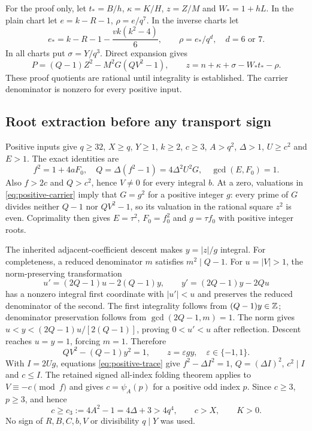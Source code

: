 For the proof only, let $t_*=B/h$, $\kappa=K/H$, $z=Z/M$ and
$W_*=1+hL$. In the plain chart let $e=k-R-1$, $\rho=e/q^7$.
In the inverse charts let
\[
 e_*=k-R-1-\frac{vk(k^2-4)}6,
 \qquad \rho=e_*/q^d,
 \quad d=6\text{ or }7.
\]
In all charts put $\sigma=Y/q^3$. Direct expansion gives
\begin{equation}\label{eq:positive-carrier}
 P=(Q-1)Z^2-M^2G(QV^2-1),\qquad
 z=n+\kappa+\sigma-W_*t_*-\rho.
\end{equation}
These proof quotients are rational until integrality is established.
The carrier denominator is nonzero for every positive input.

\subsection{Root extraction before any transport sign}
Positive inputs give $q\ge32$, $X\ge q$, $Y\ge1$, $k\ge2$,
$c\ge3$, $A>q^2$, $\Delta>1$, $U\ge c^2$ and $E>1$.
The exact identities are
\begin{equation}\label{eq:positive-trace}
 f^2=1+4aF_0,\quad Q=\Delta(f^2-1)=4\Delta^2U^2G,
 \quad\gcd(E,F_0)=1.
\end{equation}
Also $f>2c$ and $Q>c^2$, hence $V\ne0$ for every integral $b$.
At a zero, valuations in \eqref{eq:positive-carrier} imply that
$G=g^2$ for a positive integer $g$: every prime of $G$ divides neither
$Q-1$ nor $QV^2-1$, so its valuation in the rational square $z^2$ is
even. Coprimality then gives $E=\tau^2$, $F_0=f_0^2$ and
$g=\tau f_0$ with positive integer roots.

The inherited adjacent-coefficient descent makes $y=|z|/g$ integral.
For completeness, a reduced denominator $m$ satisfies $m^2\mid Q-1$.
For $u=|V|>1$, the norm-preserving transformation
\[
 u'=(2Q-1)u-2(Q-1)y,\qquad
 y'=(2Q-1)y-2Qu
\]
has a nonzero integral first coordinate with $|u'|<u$ and preserves the
reduced denominator of the second. The first integrality follows from
$(Q-1)y\in\mathbb Z$; denominator preservation follows from
$\gcd(2Q-1,m)=1$. The norm gives
$u<y<(2Q-1)u/[2(Q-1)]$, proving $0<u'<u$ after reflection.
Descent reaches $u=y=1$, forcing $m=1$. Therefore
\[
 QV^2-(Q-1)y^2=1,\qquad z=\varepsilon gy,
 \quad\varepsilon\in\{-1,1\}.
\]
With $I=2Ug$, equations \eqref{eq:positive-trace} give
$f^2-\Delta I^2=1$, $Q=(\Delta I)^2$, $c^2\mid I$ and $c\le I$.
The retained signed all-index folding theorem applies to $V\equiv-c\pmod f$
and gives $c=\psi_A(p)$ for a positive odd index $p$. Since $c\ge3$,
$p\ge3$, and hence
\begin{equation}\label{eq:positive-c3}
 c\ge c_3:=4A^2-1=4\Delta+3>4q^4,
 \qquad c>X,\qquad K>0.
\end{equation}
No sign of $R,B,C,b,V$ or divisibility $q\mid Y$ was used.

